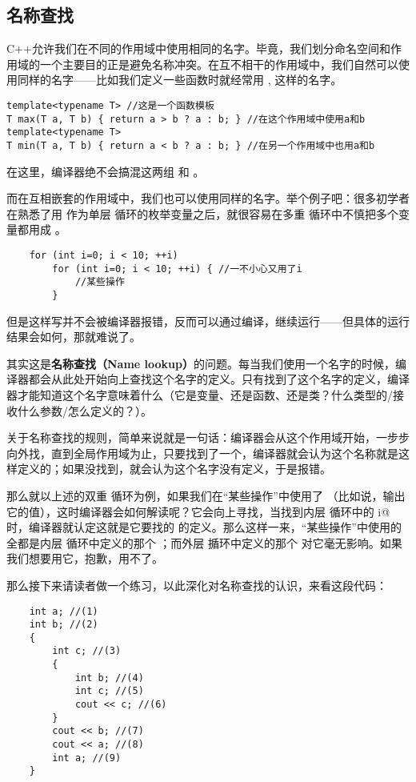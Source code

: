 \subsection*{名称查找}
C++允许我们在不同的作用域中使用相同的名字。毕竟，我们划分命名空间和作用域的一个主要目的正是避免名称冲突。在互不相干的作用域中，我们自然可以使用同样的名字——比如我们定义一些函数时就经常用 \lstinline@a@, \lstinline@b@ 这样的名字。
\begin{lstlisting}
template<typename T> //这是一个函数模板
T max(T a, T b) { return a > b ? a : b; } //在这个作用域中使用a和b
template<typename T>
T min(T a, T b) { return a < b ? a : b; } //在另一个作用域中也用a和b
\end{lstlisting}
在这里，编译器绝不会搞混这两组 \lstinline@a@ 和 \lstinline@b@。\par
而在互相嵌套的作用域中，我们也可以使用同样的名字。举个例子吧：很多初学者在熟悉了用 \lstinline@i@ 作为单层 \lstinline@for@ 循环的枚举变量之后，就很容易在多重 \lstinline@for@ 循环中不慎把多个变量都用成 \lstinline@i@。
\begin{lstlisting}
    for (int i=0; i < 10; ++i) 
        for (int i=0; i < 10; ++i) { //一不小心又用了i
            //某些操作
        }
\end{lstlisting}
但是这样写并不会被编译器报错，反而可以通过编译，继续运行——但具体的运行结果会如何，那就难说了。\par
其实这是\textbf{名称查找（Name lookup）}的问题。每当我们使用一个名字的时候，编译器都会从此处开始向上查找这个名字的定义。只有找到了这个名字的定义，编译器才能知道这个名字意味着什么（它是变量、还是函数、还是类？什么类型的/接收什么参数/怎么定义的？）。\par
关于名称查找的规则，简单来说就是一句话：编译器会从这个作用域开始，一步步向外找，直到全局作用域为止，只要找到了一个，编译器就会认为这个名称就是这样定义的；如果没找到，就会认为这个名字没有定义，于是报错。\par
那么就以上述的双重 \lstinline@for@ 循环为例，如果我们在``某些操作''中使用了 \lstinline@i@（比如说，输出它的值），这时编译器会如何解读呢？它会向上寻找，当找到内层 \lstinline@for@ 循环中的 \lstinline@int i@ 时，编译器就认定这就是它要找的 \lstinline@i@ 的定义。那么这样一来，``某些操作''中使用的 \lstinline@i@ 全都是内层 \lstinline@for@ 循环中定义的那个 \lstinline@i@；而外层 \lstinline@for@ 揗环中定义的那个 \lstinline@i@ 对它毫无影响。如果我们想要用它，抱歉，用不了。\par
那么接下来请读者做一个练习，以此深化对名称查找的认识，来看这段代码：
\begin{lstlisting}
    int a; //(1)
    int b; //(2)
    {
        int c; //(3)
        {
            int b; //(4)
            int c; //(5)
            cout << c; //(6)
        }
        cout << b; //(7)
        cout << a; //(8)
        int a; //(9)
    }
\end{lstlisting}
